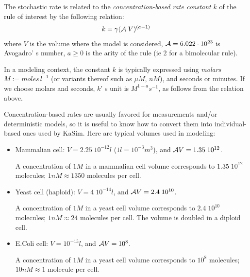 \documentclass[11pt]{book}
\def\ga{\gamma}
\def\ie{ie }
\def\mit#1{{\mathit #1}}
\begin{document}
The stochastic rate is related to the \emph{concentration-based rate constant} $k$ of the rule of interest by the following relation:
%
%
\begin{equation}\label{stochrate}
k = \ga{({\cal A}\; V)^{(a-1)}} %
\end{equation}
where 
$V$ is the volume where the model is considered,
${\cal A}= 6.022\cdot 10^{23}$ is Avogadro' s number, %
$a\geq0$ is the arity of the rule (\ie 2 for a bimolecular rule).

In a modeling context, the constant $k$ is typically expressed using \emph{molars} $M:=\mit{moles}\,l^{-1}$ (or variants thereof such
as $\mu M$, $nM$), and seconds or minutes. If we choose molars and seconds, $k$' s unit is $\mathit{M}^{1-a}\mathit{s}^{-1}$, as 
follows from the relation above.

Concentration-based rates are usually favored for measurements and/or deterministic models, so it is useful to know how to convert them into
individual-based ones used by KaSim. 
Here are typical volumes used in modeling:
\begin{itemize}
\item
Mammalian cell: $V=2.25\; 10^{-12}l$  ($1l=10^{-3}m^3$), and ${\cal A}V=1.35\; 10^{12}$. 

A concentration of $1M$ in a mammalian cell volume corresponds to $1.35\; 10^{12}$ molecules; $1nM\approx 1350$ molecules per cell.
\item
Yeast cell (haploid): $V=4\; 10^{-14}l$, and ${\cal A}V=2.4\; 10^{10}$. 

A concentration of $1M$ in a yeast cell volume corresponds to $2.4\; 10^{10}$ molecules; $1nM\approx 24$ molecules per cell. The volume is doubled in a diploid cell.
\item
E.\@ Coli cell: $V=10^{-15}l$, and ${\cal A}V=10^{8}$. 

A concentration of $1M$ in a yeast cell volume corresponds to $10^{8}$ molecules; $10nM\approx 1$ molecule per cell.
\end{itemize}
\end{document}
